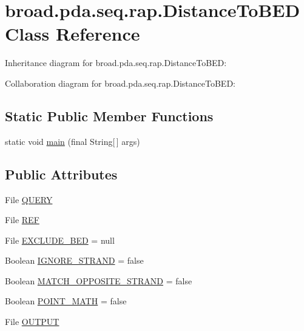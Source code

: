 \hypertarget{classbroad_1_1pda_1_1seq_1_1rap_1_1_distance_to_b_e_d}{\section{broad.\+pda.\+seq.\+rap.\+Distance\+To\+B\+E\+D Class Reference}
\label{classbroad_1_1pda_1_1seq_1_1rap_1_1_distance_to_b_e_d}
}


Inheritance diagram for broad.\+pda.\+seq.\+rap.\+Distance\+To\+B\+E\+D\+:


Collaboration diagram for broad.\+pda.\+seq.\+rap.\+Distance\+To\+B\+E\+D\+:
\subsection*{Static Public Member Functions}
\begin{DoxyCompactItemize}
\item 
static void \hyperlink{classbroad_1_1pda_1_1seq_1_1rap_1_1_distance_to_b_e_d_afa76da5ddaf7d7a921ad7737ebd604cf}{main} (final String\mbox{[}$\,$\mbox{]} args)
\end{DoxyCompactItemize}
\subsection*{Public Attributes}
\begin{DoxyCompactItemize}
\item 
File \hyperlink{classbroad_1_1pda_1_1seq_1_1rap_1_1_distance_to_b_e_d_a67f7ac85eecf225e520cb72583b98fd6}{Q\+U\+E\+R\+Y}
\item 
File \hyperlink{classbroad_1_1pda_1_1seq_1_1rap_1_1_distance_to_b_e_d_a6b2caad00d377751fa67a5cc0c87e25f}{R\+E\+F}
\item 
File \hyperlink{classbroad_1_1pda_1_1seq_1_1rap_1_1_distance_to_b_e_d_ac2be73ca7e61fd6223f7b71e46a43b2d}{E\+X\+C\+L\+U\+D\+E\+\_\+\+B\+E\+D} = null
\item 
Boolean \hyperlink{classbroad_1_1pda_1_1seq_1_1rap_1_1_distance_to_b_e_d_aab459f090a02c3e7eb185c3207820d59}{I\+G\+N\+O\+R\+E\+\_\+\+S\+T\+R\+A\+N\+D} = false
\item 
Boolean \hyperlink{classbroad_1_1pda_1_1seq_1_1rap_1_1_distance_to_b_e_d_a702a7ac49ba5c6b98d0191cedf59cbfe}{M\+A\+T\+C\+H\+\_\+\+O\+P\+P\+O\+S\+I\+T\+E\+\_\+\+S\+T\+R\+A\+N\+D} = false
\item 
Boolean \hyperlink{classbroad_1_1pda_1_1seq_1_1rap_1_1_distance_to_b_e_d_a05503ac1d7cb6fdfb47447c128a110ab}{P\+O\+I\+N\+T\+\_\+\+M\+A\+T\+H} = false
\item 
File \hyperlink{classbroad_1_1pda_1_1seq_1_1rap_1_1_distance_to_b_e_d_a0f81ee8b473abfd8df63981e67619660}{O\+U\+T\+P\+U\+T}
\end{DoxyCompactItemize}
